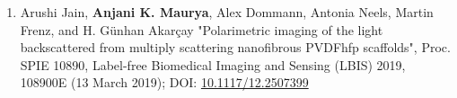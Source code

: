\begin{enumerate}[itemsep=0pt,parsep=7pt]

\item Arushi Jain, \textbf{Anjani K. Maurya}, Alex Dommann, Antonia Neels, Martin Frenz, and H. Günhan Akarçay "Polarimetric imaging of the light backscattered from multiply scattering nanofibrous PVDFhfp scaffolds", Proc. SPIE 10890, Label-free Biomedical Imaging and Sensing (LBIS) 2019, 108900E (13 March 2019); DOI: \textcolor{cyan}{\href{https://www.spiedigitallibrary.org/conference-proceedings-of-spie/10890/2507399/Polarimetric-imaging-of-the-light-backscattered-from-multiply-scattering-nanofibrousPVDFhfp/10.1117/12.2507399.short?SSO=1}{10.1117/12.2507399}}

				
	\end{enumerate}